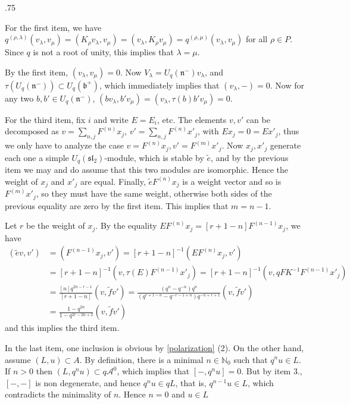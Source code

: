 \documentclass[11pt,fleqn]{article}
\makeatletter
\renewenvironment{proof}[1][\proofname]{\par
  \pushQED{\qed}%
  \normalfont \topsep.75\paraskip\relax
  \trivlist
  \item[\hskip\labelsep
        \itshape
    #1\@addpunct{.}]\ignorespaces
}{%
  \popQED\endtrivlist\@endpefalse
}
\newcommand\NN{\mathbb N}
\newcommand\A{\mathcal A}
\renewcommand\b{\mathfrak{b}}
\newcommand\n{\mathfrak{n}}
\makeatother
\begin{document}
\begin{proof}
	For the first item, we have $q^{(\rho,\lambda)} (v_\lambda, v_\mu) = (K_\rho
v_\lambda, v_\mu) = (v_\lambda, K_\rho v_\mu) = q^{(\rho, \mu)} (v_\lambda,v_\mu)$ for all
$\rho \in P$. Since $q$ is not a root of unity, this implies that $\lambda = \mu$.

	By the first item, $(v_\lambda,v_\mu) = 0$. Now $V_\lambda = U_q(\n^-) v_\lambda$, 
and $\tau(U_q(\n^-)) \subset U_q(\b^+)$, which immediately implies that $(v_\lambda,-) = 0$. 
Now for any two $b,b' \in U_q(\n^-)$, $(bv_\lambda, b'v_\mu) = (v_\lambda, \tau(b)b'v_\mu)
= 0$.

	For the third item, fix $i$ and write $E = E_i$, etc. The elements $v, v'$ can be 
decomposed as $v = \sum_{n,j} F^{(n)} x_j$, $v' =\sum_{n,j} F^{(n)} x'_j$, with $E x_j = 0
= E x'_j$, thus we only have to analyze the case $v = F^{(n)}x_j, v' = F^{(m)}x'_j$. Now
$x_j, x'_j$ generate each one a simple $U_q(\mathfrak{sl_2})$-module, which is stable by 
$\tilde e$, and by the previous item we may and do assume that this two modules are 
isomorphic. Hence the weight of $x_j$ and $x'_j$ are equal. Finally, $\tilde e F^{(n)}x_j$ 
is a weight vector and so is $F^{(m)}x'_j$, so they must have the same weight, otherwise 
both sides of the previous equality are zero by the first item. This implies that $m = n-1$. 

Let $r$ be the weight of $x_j$. By the equality $ EF^{(n)} x_j = [r+1-n] F^{(n-1)} x_j$, we 
have
\begin{align*}
	(\tilde e v,v')	&= (F^{(n-1)}x_j, v') = [r+1-n]^{-1}(EF^{(n)}x_j,v') \\
			&= [r+1-n]^{-1}(v,\tau(E)F^{(n-1)}x'_j) =
[r+1-n]^{-1}(v,qFK^{-1}F^{(n-1)}x'_j) \\
			&= \frac{[n]q^{2n-r-1}}{[r+1-n]}(v,\tilde f v')
= \frac{(q^n - q^{-n})q^{n}}{(q^{r+1-n}-q^{-r-1+n})q^{-n+r+1}}(v,\tilde f v') \\
			&= \frac{1-q^{2n}}{1-q^{2r-2n+2}}(v,\tilde f v')
\end{align*}
and this implies the third item.

In the last item, one inclusion is obvious by \ref{polarization} (2). On the other hand,
assume $(L,u) \subset A$. By definition, there is a minimal $n \in \NN_0$ such that $q^n u
\in L$. If $n > 0$ then $(L,q^n u) \subset q\A^0$, which implies that $[-,q^n u] = 0$. But
by item 3., $[-,-]$ is non degenerate, and hence $q^n u \in q L$, that is, $q^{n-1} u \in
L$, which contradicts the minimality of $n$. Hence $n = 0$ and $u \in L$
\end{proof}
\end{document}

